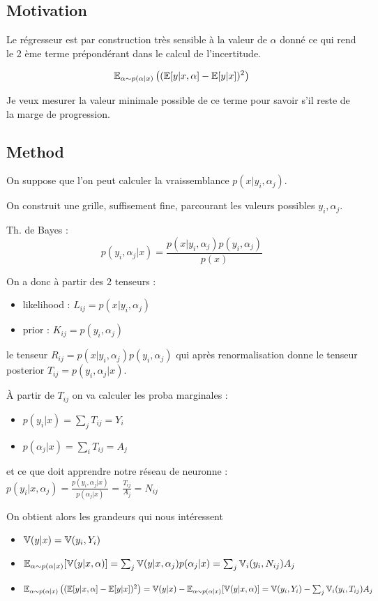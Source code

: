 \subsection{Motivation} %
\label{sub:motivation}

Le régresseur est par construction très sensible à la valeur de $\alpha$ donné ce qui rend le 2 ème terme prépondérant dans le calcul de l'incertitude.

$$\mathbb{E}_{\alpha \sim p(\alpha|x)} \left ((\mathbb{E} [y|x, \alpha]  - \mathbb{E}[y|x])^2\right )$$

Je veux mesurer la valeur minimale possible de ce terme pour savoir s'il reste de la marge de progression.

\subsection{Method} %
\label{sub:method}



On suppose que l'on peut calculer la vraissemblance $p(x|y_i, \alpha_j)$.

On construit une grille, suffisement fine, parcourant les valeurs possibles $y_i, \alpha_j$.

Th. de Bayes : 
$$
    p(y_i, \alpha_j | x) = \frac{p(x|y_i, \alpha_j) p(y_i, \alpha_j)}{p(x)}
$$

On a donc à partir des 2 tenseurs : 
\begin{itemize}
	\item likelihood : $L_{ij} = p(x|y_i, \alpha_j)$
	\item prior : $K_{ij} = p(y_i, \alpha_j)$ 
\end{itemize}

le tenseur $ R_{ij} = p(x|y_i, \alpha_j) p(y_i, \alpha_j) $ 
qui après renormalisation donne le tenseur posterior $ T_{ij} = p(y_i, \alpha_j | x)$.

À partir de $T_{ij}$ on va calculer les proba marginales :
\begin{itemize}
	\item $p(y_i | x) = \sum_j T_{ij} = Y_i$
	\item $p(\alpha_j | x) = \sum_i T_{ij} = A_j$
\end{itemize}

et ce que doit apprendre notre réseau de neuronne : $p(y_i | x, \alpha_j) = \frac{p(y_i, \alpha_j | x)}{p(\alpha_j | x)} = \frac{T_{ij}}{A_j} = N_{ij}$

On obtient alors les grandeurs qui nous intéressent
\begin{itemize}
	\item $ \mathbb{V}(y|x) = \mathbb{V}(y_i, Y_i) $
	\item $ \mathbb{E}_{\alpha \sim p(\alpha|x)}[ \mathbb{V}(y|x, \alpha) ] = \sum_j \mathbb{V}(y|x, \alpha_j) p(\alpha_j | x) = \sum_j \mathbb{V}_i(y_i, N_{ij}) A_j$
	\item $\mathbb{E}_{\alpha \sim p(\alpha|x)} \left ((\mathbb{E} [y|x, \alpha]  - \mathbb{E}[y|x])^2\right ) = \mathbb{V}(y|x) - \mathbb{E}_{\alpha \sim p(\alpha|x)}[ \mathbb{V}(y|x, \alpha) ] = \mathbb{V}(y_i, Y_i) - \sum_j \mathbb{V}_i(y_i, T_{ij}) A_j$
\end{itemize}


